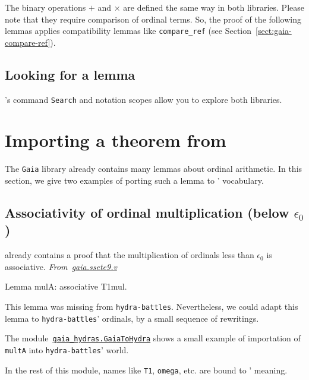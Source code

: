 The binary operations $+$ and $\times$ are defined the same way in both libraries. Please note that they require comparison of ordinal terms. So, the proof of the following lemmas applies
compatibility lemmas like \texttt{compare\_ref} (see Section~\vref{sect:gaia-compare-ref}).


\subsection{Looking for a lemma}
\coq's command \texttt{Search} and notation scopes allow you to explore both libraries.


\section{Importing a theorem from \gaia}
The \texttt{Gaia} library already contains many lemmas about
ordinal arithmetic. In this section, we give two examples of
porting such a lemma to \HydrasLib' vocabulary.

\subsection{Associativity of ordinal multiplication (below \texorpdfstring{$\epsilon_0$}{epsilon\_0})}
\gaia already contains a proof that the multiplication of ordinals less than $\epsilon_0$ is associative.
\emph{From~\href{https://github.com/coq-community/gaia/blob/master/theories/ssete9.v}{gaia.ssete9.v}}

\begin{Coqsrc}
Lemma mulA: associative T1mul.
\end{Coqsrc}

This lemma was missing from \texttt{hydra-battles}. Nevertheless, we could adapt this lemma to \texttt{hydra-battles}' ordinals, by a small sequence of rewritings.


The module~\href{../theories/html/gaia_hydras.GaiaToHydra.html}%
{\texttt{gaia\_hydras.GaiaToHydra}} shows a small
example of importation of \texttt{multA} into \texttt{hydra-battles}' world.


In the rest of this module, names like  \texttt{T1}, \texttt{omega}, etc. are  bound to \HydrasLib' meaning.

